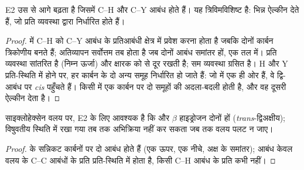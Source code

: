 \begin{proposition}[E2 प्रति और त्रिविमविशिष्ट है]\label{prop:b1:elimination:anti}
E2 उस  से आगे बढ़ता है जिसमें C--H और C--Y आबंध
 होते हैं। यह त्रिविमविशिष्ट है:  
भिन्न ऐल्कीन  देते हैं, जो प्रति व्यवस्था द्वारा निर्धारित होते हैं।
\end{proposition}

\begin{proof}
 में C--H  को C--Y आबंध के प्रतिआबंधी क्षेत्र में
प्रवेश करना होता है जबकि दोनों कार्बन त्रिकोणीय बनते हैं; अतिव्यापन
सर्वोत्तम तब होता है जब दोनों आबंध समांतर हों, एक तल में। प्रति व्यवस्था
सांतरित है (निम्न ऊर्जा) और क्षारक को  से दूर रखती है; सम व्यवस्था
ग्रसित है। H और Y प्रति-स्थिति में होने पर, हर कार्बन के दो अन्य समूह
निर्धारित हो जाते हैं: जो  में एक ही ओर हैं, वे द्वि-आबंध पर
\textit{cis} पहुँचते हैं। किसी  में एक कार्बन पर दो समूहों की अदला-बदली
होती है, और वह दूसरी ऐल्कीन देता है।
\end{proof}

\begin{proposition}[साइक्लोहेक्सेन पर E2]\label{prop:b1:elimination:cyclohexane-e2}
साइक्लोहेक्सेन वलय पर, E2 के लिए आवश्यक है कि  और $\beta$
हाइड्रोजन दोनों  हों (\textit{trans}-द्विअक्षीय); विषुवतीय स्थिति में रखा गया
 तब तक अभिक्रिया नहीं कर सकता जब तक वलय पलट न जाए।
\end{proposition}

\begin{proof}
 के सन्निकट कार्बनों पर दो  आबंध  होते हैं (एक
ऊपर, एक नीचे, अक्ष के समांतर);  आबंध केवल वलय के
C--C आबंधों के प्रति प्रति-स्थिति में होता है, किसी C--H आबंध के प्रति कभी नहीं।
\end{proof}

